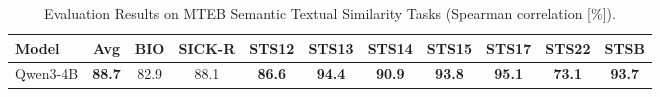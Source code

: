 \documentclass[11pt]{article}
\begin{document}
\begin{table}[H]
\caption{Evaluation Results on MTEB Semantic Textual Similarity Tasks (Spearman correlation [\%]).}
\label{tab:mteb_en_sts}
\setlength{\tabcolsep}{3pt}
\centering
\small
\begin{tabular}{l*{10}{c}}
\toprule
\textbf{Model} & \textbf{Avg} & \textbf{BIO} & \textbf{SICK-R} & \textbf{STS12} & \textbf{STS13} & \textbf{STS14} & \textbf{STS15} & \textbf{STS17} & \textbf{STS22} & \textbf{STSB} \\
\midrule
Qwen3-4B & \textbf{88.7} & 82.9 & 88.1 & \textbf{86.6} & \textbf{94.4} & \textbf{90.9} & \textbf{93.8} & \textbf{95.1} & \textbf{73.1} & \textbf{93.7} \\

\end{tabular}
\end{table}
\end{document}
